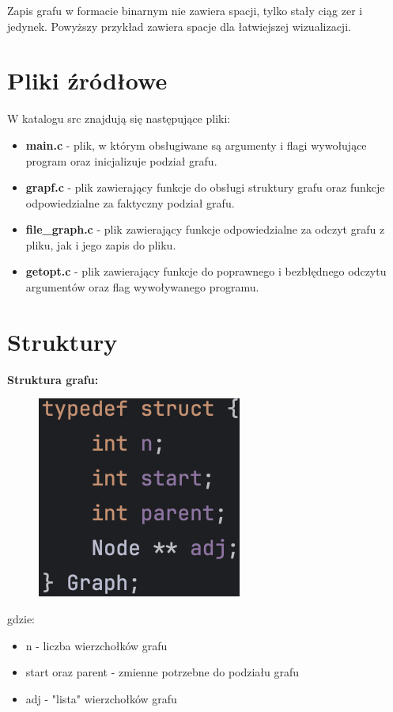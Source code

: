 \documentclass{article}
\begin{document}
Zapis grafu w formacie binarnym nie zawiera spacji, tylko stały ciąg zer i jedynek. Powyższy przykład zawiera spacje dla łatwiejszej wizualizacji.

\section*{Pliki źródłowe}
W katalogu src znajdują się następujące pliki:
\begin{itemize}
    \item \textbf{main.c} - plik, w którym obsługiwane są argumenty i flagi wywołujące program oraz inicjalizuje podział grafu.

    \item \textbf{grapf.c} - plik zawierający funkcje do obsługi struktury grafu oraz funkcje odpowiedzialne za faktyczny podział grafu.

    \item \textbf{file\_graph.c} - plik zawierający funkcje odpowiedzialne za odczyt grafu z pliku, jak i jego zapis do pliku.

    \item \textbf{getopt.c} - plik zawierający funkcje do poprawnego i bezbłędnego odczytu argumentów oraz flag wywoływanego programu.
    
\end{itemize}

\newpage

\section*{Struktury}
\textbf{Struktura grafu:}\\

\begin{figure}[ht]
  \includegraphics[]{img/graph.png}
\end{figure}
gdzie:
\begin{itemize}
    \item n - liczba wierzchołków grafu
    \item start oraz parent - zmienne potrzebne do podziału grafu
    \item adj - "lista" wierzchołków grafu
\end{itemize}
\end{document}
